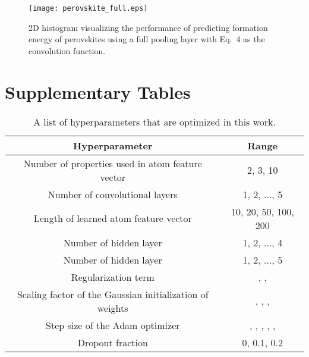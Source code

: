 \documentclass[twocolumn, prl]{revtex4-1}
\begin{document}
\begin{figure}[htb]
    \centering
    \texttt{[image: perovskite\_full.eps]}
    \caption{2D histogram visualizing the performance of predicting formation energy of perovskites using a full pooling layer with Eq.~4 as the convolution function.  }
    \label{fig:perovskite-full}
\end{figure}

\clearpage

\section{Supplementary Tables}


\begin{table}[htb]\caption{A list of hyperparameters that are optimized in this work. }
\begin{ruledtabular}
\begin{tabular}{cc}
  Hyperparameter                                  & Range		\\
  \hline
  Number of properties used in atom feature vector  & 2, 3, 10\\
  Number of convolutional layers                  & 1, 2, ..., 5    	\\
  Length of learned atom feature vector   & 10, 20, 50, 100, 200 \\
  Number of hidden layer \footnotemark[1]    & 1, 2, ..., 4 \\
  Number of hidden layer \footnotemark[1]    & 1, 2, ..., 5 \\
  Regularization term \footnotemark[2]   & , ,  \\
  Scaling factor of the Gaussian initialization of weights  & , , ,  \\
  Step size of the Adam optimizer\cite{kingma2014adam}  &  , , , , ,  \\
  Dropout fraction\cite{srivastava2014dropout}   & 0, 0.1, 0.2 \\



\end{tabular}
\end{ruledtabular}
\label{tab:list-of-hyper}
\end{table}
\end{document}
